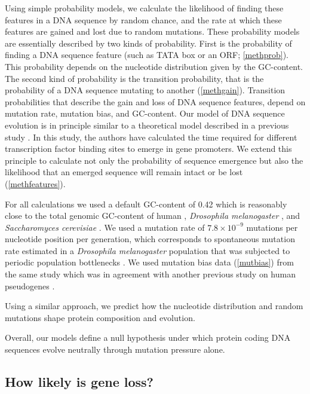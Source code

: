 \documentclass[12pt,a4paper]{article}
\begin{document}
Using simple probability models, we calculate the likelihood of finding these features in a DNA sequence by random chance, and the rate at which these features are gained and lost due to random mutations. These probability models are essentially described by two kinds of probability. First is the probability of finding a DNA sequence feature (such as TATA box or an ORF; \autoref{methprob}). This probability depends on the nucleotide distribution given by the GC-content. The second kind of probability is the transition probability, that is the probability of a DNA sequence mutating to another (\autoref{methgain}). Transition probabilities that describe the gain and loss of DNA sequence features, depend on mutation rate, mutation bias, and GC-content. Our model of DNA sequence evolution is in principle similar to a theoretical model described in a previous study \citep{promoterWaiting}. In this study, the authors have calculated the time required for different transcription factor binding sites to emerge in gene promoters. We extend this principle to calculate not only the probability of sequence emergence but also the likelihood that an emerged sequence will remain intact or be lost (\autoref{methfeatures}).

For all calculations we used a default GC-content of 0.42 which is reasonably close to the total genomic GC-content of human \citep[0.41,][]{Merchant2007}, \textit{Drosophila melanogaster} \citep[0.416,][]{flybase}, and \textit{Saccharomyces cerevisiae} \citep[0.38,][]{yeastGC}. We used a mutation rate of $7.8\times10^{-9}$ mutations per nucleotide position per generation, which corresponds to spontaneous mutation rate estimated in a \textit{Drosophila melanogaster} population that was subjected to periodic population bottlenecks \cite[mutation accumulation line,][]{drosophilamutrate}. We used mutation bias data (\autoref{mutbias}) from the same study \citep{drosophilamutrate} which was in agreement with another previous study on human pseudogenes \citep{humanmutrate}.

Using a similar approach, we predict how the nucleotide distribution and random mutations shape protein composition and evolution. 

Overall, our models define a null hypothesis under which protein coding DNA sequences evolve neutrally through mutation pressure alone.

\subsection{How likely is gene loss?}
\end{document}
